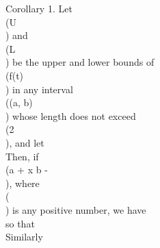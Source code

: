Corollary 1. Let \\(U\\) and \\(L\\) be the upper and lower bounds of \\(f(t)\\) in any
interval \\((a, b)\\) whose length does not exceed \\(2\pi\\), and let
\\[ 
\int_{-\pi}^{\pi}\! \left| \, f(t) \, \right|  \, d t = \pi A.
\\] 
Then, if \\(a + \eta \leq x \leq b - \eta\\), where \\(\eta\\) is any positive number, we have
\\[ \begin{align*}
  U
  -
  \frac{1}{m}
  \left\{
    A_{0}
    +
    \sum_{n=1}^{m-1} S_{n}(x)
  \right\}
  &
  =
  \frac{1}{2 m \pi}
  \left\{
    \int_{-\pi + x}^{x - \eta}\!
    + \int_{x - \eta}^{x + \eta}\!
    + \int_{x + \eta}^{\pi + x}
  \right\}
  \frac{\sin^{2} \frac{1}{2} m (x-t)}{\sin^{2} \frac{1}{2} (x-t)}
  \left\{
    U - f(t)
  \right\}
  \, d t
  \\
  &
  \geq
  \frac{1}{2 m \pi}
  \left\{
    \int_{-\pi + x}^{x - \eta}\!
    + \int_{x + \eta}^{\pi + x}
  \right\}
  \frac{\sin^{2} \frac{1}{2} m (x-t)}{\sin^{2} \frac{1}{2} (x-t)}
  \left\{
    U - f(t)
  \right\}
  \, d t
  \\
  &
  \geq
  -\frac{1}{2 m \pi}
  \left\{
    \int_{-\pi + x}^{x - \eta}\!
    + \int_{x + \eta}^{\pi + x}
  \right\}
  \frac{\left| \, U \, \right|  + \left| \, f(t) \, \right| }{\sin^{2} \frac{1}{2} \eta}
  \, d t
\end{align*} \\]
so that
\\[ 
\frac{1}{m}
\left\{
  A_{0}
  + \sum_{n=1}^{m-1} S_{n}(x)
\right\}
\leq
U +
\left\{
  \left| \, U \, \right| 
  + \frac{1}{2} A
\right\}
/
\left\{
  m \sin^{2} \frac{1}{2} \eta
\right\}.
\\] 
Similarly
\\[ 
\frac{1}{m}
\left\{
  A_{0}
  + \sum_{n=1}^{m-1} S_{n}(x)
\right\}
\geq
L -
\left\{
  \left| \, L \, \right| 
  + \frac{1}{2} A
\right\}
/
\left\{
  m \sin^{2} \frac{1}{2} \eta
\right\}.
\\] 
